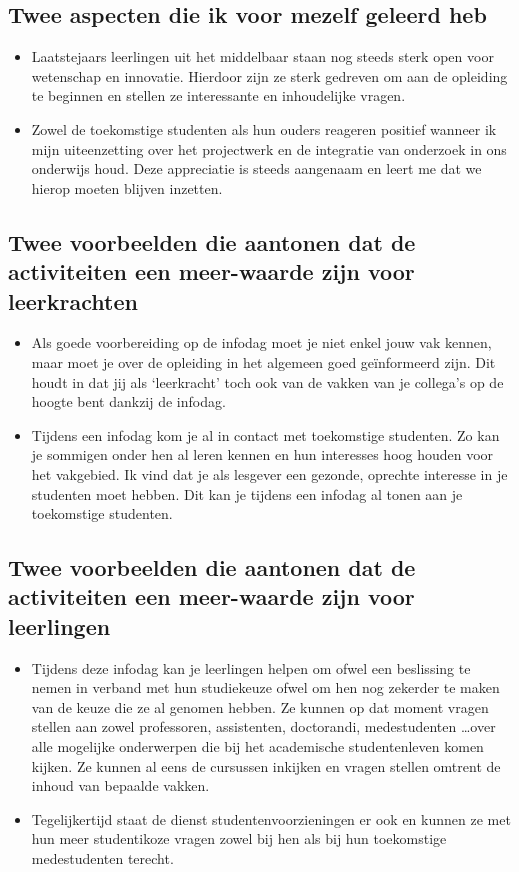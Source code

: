 \documentclass[a4paper,12pt,twoside]{article}%
\begin{document}
	\subsection{Twee aspecten die ik voor mezelf geleerd heb}
	\begin{itemize}
		\item Laatstejaars leerlingen uit het middelbaar staan nog steeds sterk open voor wetenschap en innovatie. Hierdoor zijn ze sterk gedreven om aan de opleiding te beginnen en stellen ze interessante en inhoudelijke vragen.
		\item Zowel de toekomstige studenten als hun ouders reageren positief wanneer ik mijn uiteenzetting over het projectwerk en de integratie van onderzoek in ons onderwijs houd. Deze appreciatie is steeds aangenaam en leert me dat we hierop moeten blijven inzetten. 
	\end{itemize}
	
	
	\subsection{Twee voorbeelden die aantonen dat de activiteiten een meer-waarde zijn voor leerkrachten}
	\begin{itemize}
		\item Als goede voorbereiding op de infodag moet je niet enkel jouw vak kennen, maar moet je over de opleiding in het algemeen goed geïnformeerd zijn. Dit houdt in dat jij als `leerkracht' toch ook van de vakken van je collega's op de hoogte bent dankzij de infodag.
		\item Tijdens een infodag kom je al in contact met toekomstige studenten. Zo kan je sommigen onder hen al leren kennen en hun interesses hoog houden voor het vakgebied. Ik vind dat je als lesgever een gezonde, oprechte interesse in je studenten moet hebben. Dit kan je tijdens een infodag al tonen aan je toekomstige studenten.
	\end{itemize}
	
	
	\subsection{Twee voorbeelden die aantonen dat de activiteiten een meer-waarde zijn voor leerlingen}
	\begin{itemize}
		\item Tijdens deze infodag kan je leerlingen helpen om ofwel een beslissing te nemen in verband met hun studiekeuze ofwel om hen nog zekerder te maken van de keuze die ze al genomen hebben. Ze kunnen op dat moment vragen stellen aan zowel professoren, assistenten, doctorandi, medestudenten \ldots over alle mogelijke onderwerpen die bij het academische studentenleven komen kijken. Ze kunnen al eens de cursussen inkijken en vragen stellen omtrent de inhoud van bepaalde vakken.  
		\item Tegelijkertijd staat de dienst studentenvoorzieningen er ook en kunnen ze met hun meer studentikoze vragen zowel bij hen als bij hun toekomstige medestudenten terecht. 
	\end{itemize}
	
\end{document}
